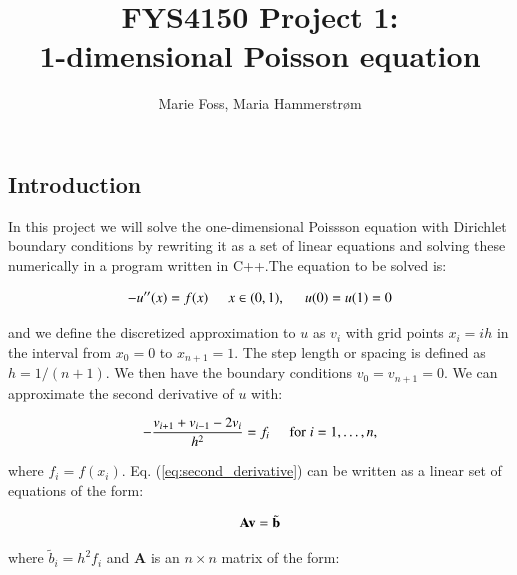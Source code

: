 \documentclass{article}
\title{\textbf{FYS4150 Project 1: \\1-dimensional Poisson equation}}
\author{Marie Foss, Maria Hammerstr{{\o}}m}
\date{} %
\begin{document}
\maketitle

\begin{abstract}
	\noindent \lipsum[1] 
	\vspace*{2ex}
\end{abstract}



\begin{multicols}{2}

\section{Introduction}
In this project we will solve the one-dimensional Poissson equation with Dirichlet boundary conditions by rewriting it as a set of linear equations and solving these numerically in a program written in C++.The equation to be solved is:

\begin{equation}\label{eq:Poisson}
	-u''(x) = f(x) \hspace{0.5cm} x\in(0,1), \hspace{0.5cm} u(0) = u(1) = 0
\end{equation}

\noindent and we define the discretized approximation  to $u$ as $v_i$  with grid points $x_i=ih$   in the interval from $x_0=0$ to $x_{n+1}=1$. The step length or spacing is defined as $h=1/(n+1)$. We then have the boundary conditions $v_0 = v_{n+1} = 0$. We can approximate the second derivative of $u$ with:

\begin{equation}\label{eq:second_derivative}
   -\frac{v_{i+1}+v_{i-1}-2v_i}{h^2} = f_i  \hspace{0.5cm} \mathrm{for} \hspace{0.1cm} i=1,\dots, n,
\end{equation}

\noindent where $f_i=f(x_i)$. Eq. (\ref{eq:second_derivative}) can be written as a linear set of equations of the form: 

\begin{equation}
	{\bf A}{\bf v} = \tilde{{\bf b}}
\end{equation}

\noindent where $\tilde{b}_i=h^2f_i$ and \textbf{A} is an $n\times n$ matrix of the form:


\end{multicols}
\end{document}
